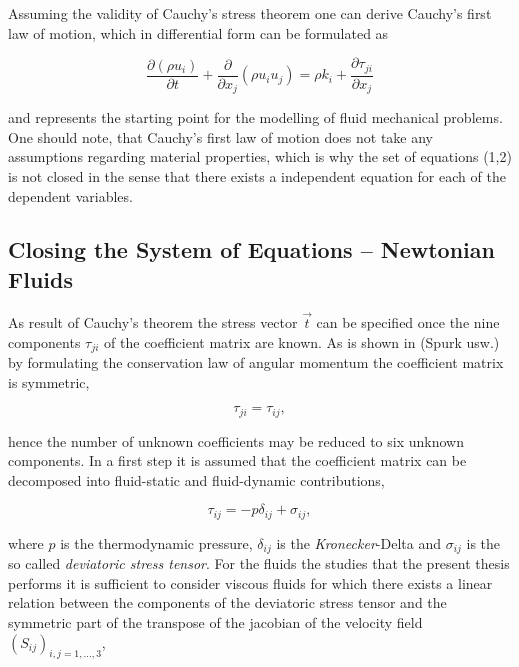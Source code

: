     Assuming the validity of Cauchy's stress theorem one can derive Cauchy's first law of motion, which in differential form can be formulated as

    \begin{equation}
      \label{eq:cauchymotion}
      \frac{\partial \left(\rho u_i \right)}{\partial t} 
      + \frac{\partial}{\partial x_j}\left( \rho u_i u_j \right) 
      = \rho k_i + \frac{\partial \tau_{ji}}{\partial x_j}
    \end{equation}

    and represents the starting point for the modelling of fluid mechanical problems. One should note, that Cauchy's first law of motion does not take any assumptions regarding material properties, which is why the set of equations (1,2) is not closed in the sense that there exists a independent equation for each of the dependent variables.

    \subsection{Closing the System of Equations -- Newtonian Fluids}

    As result of Cauchy's theorem the stress vector \( \vec{t} \) can be specified once the nine components \(\tau_{ji}\) of the coefficient matrix are known. As is shown in (Spurk usw.) by formulating the conservation law of angular momentum the coefficient matrix is symmetric, 

    \begin{equation}
      \label{eq:stresssymetry}
      \tau_{ji} = \tau_{ij},
    \end{equation}
    
    hence the number of unknown coefficients may be reduced to six unknown components. In a first step it is assumed that the coefficient matrix can be decomposed into fluid-static and fluid-dynamic contributions,

    \begin{displaymath}
      \tau_{ij} = -p \delta_{ij} + \sigma_{ij},
    \end{displaymath}

    where \(p\) is the thermodynamic pressure, \(\delta_{ij}\) is the \textit{Kronecker}-Delta and \( \sigma_{ij} \) is the so called \textit{deviatoric stress tensor}. For the fluids the studies that the present thesis performs it is sufficient to consider viscous fluids for which there exists a linear relation between the components of the deviatoric stress tensor and the symmetric part of the transpose of the jacobian of the velocity field \(\left( S_{ij} \right)_{i,j=1,\dots,3}\),

